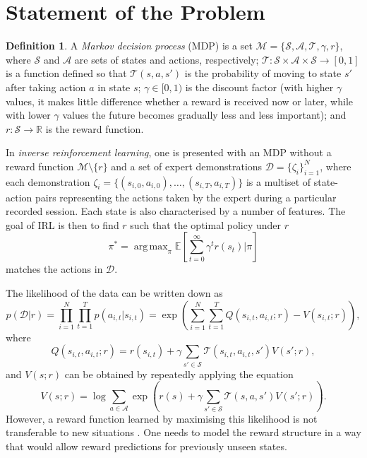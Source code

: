 \documentclass{mprop}
\theoremstyle{definition}
\newtheorem{definition}{Definition}
\DeclareMathOperator*{\argmax}{arg\,max}
\begin{document}
\section{Statement of the Problem}

\begin{definition}
  A \emph{Markov decision process} (MDP) is a set $\mathcal{M} = \{ \mathcal{S},
  \mathcal{A}, \mathcal{T}, \gamma, r \}$, where $\mathcal{S}$ and
  $\mathcal{A}$ are sets of states and actions, respectively; $\mathcal{T} :
  \mathcal{S} \times \mathcal{A} \times \mathcal{S} \to [0, 1]$ is a function
  defined so that $\mathcal{T}(s, a, s')$ is the probability of moving to state $s'$
  after taking action $a$ in state $s$; $\gamma \in [0, 1)$ is the discount
  factor (with higher $\gamma$ values, it makes little difference whether a
  reward is received now or later, while with lower $\gamma$ values the future
  becomes gradually less and less important); and $r : \mathcal{S} \to
  \mathbb{R}$ is the reward function.
\end{definition}

In \emph{inverse reinforcement learning}, one is presented with an MDP without a
reward function $\mathcal{M} \setminus \{ r \}$ and a set of expert
demonstrations $\mathcal{D} = \{ \zeta_i \}_{i=1}^N$, where each demonstration
$\zeta_i = \{ (s_{i,0}, a_{i,0}), \dots, (s_{i,T}, a_{i,T}) \}$ is a multiset of
state-action pairs representing the actions taken by the expert during a
particular recorded session. Each state is also characterised by a number of
features. The goal of IRL is then to find $r$ such that the optimal policy under
$r$
\[ \pi^* = \argmax_\pi \mathbb{E}\left[ \sum_{t=0}^\infty \gamma^t r(s_t) | \pi
  \right] \]
matches the actions in $\mathcal{D}$.

The likelihood of the data can be written down as
\cite{DBLP:conf/uai/JinDAS17,DBLP:conf/nips/LevinePK11}
\begin{equation} \label{pDr}
  p(\mathcal{D} | r) = \prod_{i=1}^N \prod_{t=1}^T p(a_{i,t} | s_{i,t}) = \exp\left( \sum_{i=1}^N \sum_{t=1}^T Q(s_{i,t}, a_{i,t}; r) - V(s_{i,t}; r) \right),
\end{equation}
where
\[ Q(s_{i,t}, a_{i,t}; r) = r(s_{i,t}) + \gamma\sum_{s' \in \mathcal{S}}
  \mathcal{T}(s_{i,t}, a_{i,t}, s')V(s'; r), \]
and $V(s; r)$ can be obtained by repeatedly applying the equation
\cite{supplementary_material}
\[ V(s; r) = \log \sum_{a \in \mathcal{A}} \exp\left( r(s) + \gamma\sum_{s' \in
      \mathcal{S}} \mathcal{T}(s, a, s')V(s'; r) \right). \]
However, a reward function learned by maximising this likelihood is not
transferable to new situations
\cite{DBLP:conf/uai/JinDAS17,DBLP:conf/nips/LevinePK11}. One needs to model the
reward structure in a way that would allow reward predictions for previously
unseen states.
\end{document}
